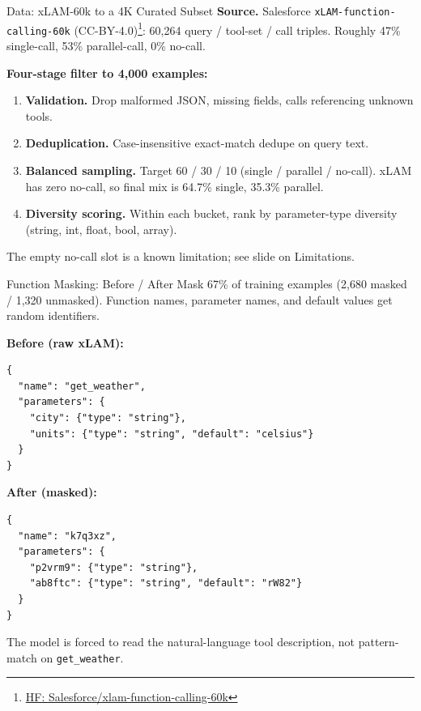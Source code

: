 \documentclass[aspectratio=169,11pt]{beamer}
\begin{document}
\begin{frame}{Data: xLAM-60k to a 4K Curated Subset}
  \textbf{Source.} Salesforce \texttt{xLAM-function-calling-60k} (CC-BY-4.0)\footnote{\href{https://huggingface.co/datasets/Salesforce/xlam-function-calling-60k}{HF: Salesforce/xlam-function-calling-60k}}: 60{,}264 query / tool-set / call triples. Roughly 47\% single-call, 53\% parallel-call, 0\% no-call.
  \vspace{4pt}

  \textbf{Four-stage filter to 4{,}000 examples:}
  \begin{enumerate}
    \item \textbf{Validation.} Drop malformed JSON, missing fields, calls referencing unknown tools.
    \item \textbf{Deduplication.} Case-insensitive exact-match dedupe on query text.
    \item \textbf{Balanced sampling.} Target 60 / 30 / 10 (single / parallel / no-call). xLAM has zero no-call, so final mix is 64.7\% single, 35.3\% parallel.
    \item \textbf{Diversity scoring.} Within each bucket, rank by parameter-type diversity (string, int, float, bool, array).
  \end{enumerate}
  \vspace{4pt}
  {\small\color{dimgray} The empty no-call slot is a known limitation; see slide on Limitations.}
\end{frame}

\begin{frame}[fragile]{Function Masking: Before / After}
  Mask 67\% of training examples (2{,}680 masked / 1{,}320 unmasked). Function names, parameter names, and default values get random identifiers.
  \vspace{4pt}

  \textbf{Before (raw xLAM):}
\begin{lstlisting}
{
  "name": "get_weather",
  "parameters": {
    "city": {"type": "string"},
    "units": {"type": "string", "default": "celsius"}
  }
}
\end{lstlisting}

  \textbf{After (masked):}
\begin{lstlisting}
{
  "name": "k7q3xz",
  "parameters": {
    "p2vrm9": {"type": "string"},
    "ab8ftc": {"type": "string", "default": "rW82"}
  }
}
\end{lstlisting}

  {\small\color{dimgray} The model is forced to read the natural-language tool description, not pattern-match on \texttt{get\_weather}.}
\end{frame}
\end{document}
